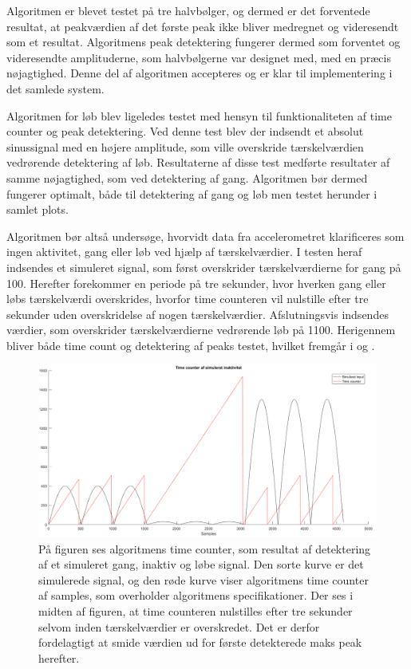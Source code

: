Algoritmen er blevet testet på tre halvbølger, og dermed er det forventede resultat, at peakværdien af det første peak ikke bliver medregnet og videresendt som et resultat. Algoritmens peak detektering fungerer dermed som forventet og videresendte amplituderne, som halvbølgerne var designet med, med en præcis nøjagtighed. Denne del af algoritmen accepteres og er klar til implementering i det samlede system.

Algoritmen for løb blev ligeledes testet med hensyn til funktionaliteten af time counter og peak detektering. Ved denne test blev der indsendt et absolut sinussignal med en højere amplitude, som ville overskride tærskelværdien vedrørende detektering af løb. Resultaterne af disse test medførte resultater af samme nøjagtighed, som ved detektering af gang. Algoritmen bør dermed fungerer optimalt, både til detektering af gang og løb men testet herunder i samlet plots.

Algoritmen bør altså undersøge, hvorvidt data fra accelerometret klarificeres som ingen aktivitet, gang eller løb ved hjælp af tærskelværdier. I testen heraf indsendes et simuleret signal, som først overskrider tærskelværdierne for gang på 100. Herefter forekommer en periode på tre sekunder, hvor hverken gang eller løbs tærskelværdi overskrides, hvorfor time counteren vil nulstille efter tre sekunder uden overskridelse af nogen tærskelværdier. Afslutningsvis indsendes værdier, som overskrider tærskelværdierne vedrørende løb på 1100. Herigennem bliver både time count og detektering af peaks testet, hvilket fremgår i  og . 
\begin{figure}[H]
	\centering
	\includegraphics[scale=0.3]{figures/cDesign/test_timecount_inaktiv.png}
	\caption{På figuren ses algoritmens time counter, som resultat af detektering af et simuleret gang, inaktiv og løbe signal. Den sorte kurve er det simulerede signal, og den røde kurve viser algoritmens time counter af samples, som overholder algoritmens specifikationer. Der ses i midten af figuren, at time counteren nulstilles efter tre sekunder selvom inden tærskelværdier er overskredet. Det er derfor fordelagtigt at smide værdien ud for første detekterede maks peak herefter.}
	\label{fig:test_inaktiv_time}
\end{figure}

